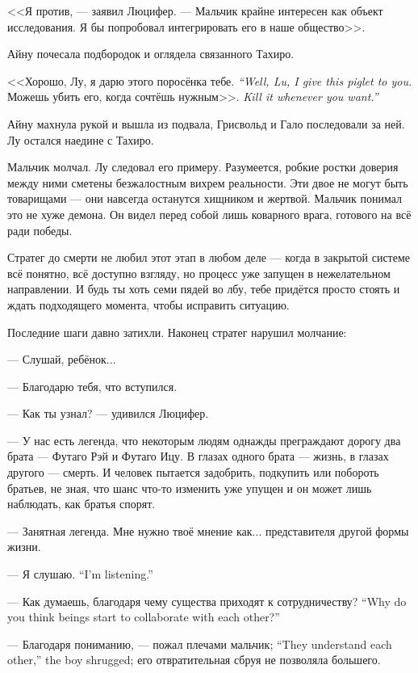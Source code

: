 <<Я против, --- заявил Люцифер.
--- Мальчик крайне интересен как объект исследования.
Я бы попробовал интегрировать его в наше общество>>.

Айну почесала подбородок и оглядела связанного Тахиро.

{<<Хорошо, Лу, я дарю этого поросёнка тебе.}
{\textit{``Well, Lu, I give this piglet to you.}}
{Можешь убить его, когда сочтёшь нужным>>.}
{\textit{Kill it whenever you want.''}}

Айну махнула рукой и вышла из подвала, Грисвольд и Гало последовали за ней.
Лу остался наедине с Тахиро.

Мальчик молчал.
Лу следовал его примеру.
Разумеется, робкие ростки доверия между ними сметены безжалостным вихрем реальности.
Эти двое не могут быть товарищами --- они навсегда останутся хищником и жертвой.
Мальчик понимал это не хуже демона.
Он видел перед собой лишь коварного врага, готового на всё ради победы.

Стратег до смерти не любил этот этап в любом деле --- когда в закрытой системе всё понятно, всё доступно взгляду, но процесс уже запущен в нежелательном направлении.
И будь ты хоть семи пядей во лбу, тебе придётся просто стоять и ждать подходящего момента, чтобы исправить ситуацию.

Последние шаги давно затихли.
Наконец стратег нарушил молчание:

--- Слушай, ребёнок...

--- Благодарю тебя, что вступился.

--- Как ты узнал? --- удивился Люцифер.

--- У нас есть легенда, что некоторым людям однажды преграждают дорогу два брата --- Футаго Рэй и Футаго Ицу.
В глазах одного брата --- жизнь, в глазах другого --- смерть.
И человек пытается задобрить, подкупить или побороть братьев, не зная, что шанс что-то изменить уже упущен и он может лишь наблюдать, как братья спорят.

--- Занятная легенда.
Мне нужно твоё мнение как... представителя другой формы жизни.

{--- Я слушаю.}
{``I'm listening.''}

{--- Как думаешь, благодаря чему существа приходят к сотрудничеству?}
{``Why do you think beings start to collaborate with each other?''}

{--- Благодаря пониманию, --- пожал плечами мальчик;}
{``They understand each other,'' the boy shrugged;}
его отвратительная сбруя не позволяла большего.

